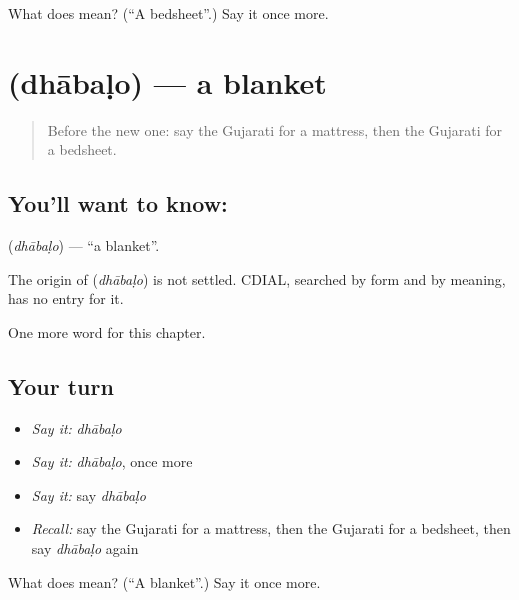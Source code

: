 \begin{tcolorbox}[breakable,colback=teal!4,colframe=teal!35!black,title={Before you move on}]
What does  mean? (\textquotedblleft{}A bedsheet\textquotedblright{}.) Say it once more.
\end{tcolorbox}
\section[\texorpdfstring{\gu{ધાબળો} (dhābaḷo)}{ધાબળો (dhābaḷo)}]{ (dhābaḷo) — a blanket}

\label{lesson:GU-C107-dhabalo}



\begin{quote}
Before the new one: say the Gujarati for a mattress, then the Gujarati for a bedsheet.
\end{quote}

\subsection*{You'll want to know: }
\textbf{} (\emph{dhābaḷo}) — \textquotedblleft{}a blanket\textquotedblright{}.

\begin{cousinweb}
The origin of \textbf{} (\emph{dhābaḷo}) is not settled. CDIAL, searched by form and by meaning, has no entry for it.
\end{cousinweb}

\begin{grammarlens}[title={What you've built}]
One more word for this chapter.
\end{grammarlens}

\subsection*{Your turn}
\begin{itemize}
\raggedright
  \item \emph{Say it:} \emph{dhābaḷo}
  \item \emph{Say it:} \emph{dhābaḷo}, once more
  \item \emph{Say it:} say \emph{dhābaḷo}
  \item \emph{Recall:} say the Gujarati for a mattress, then the Gujarati for a bedsheet, then say \emph{dhābaḷo} again
\end{itemize}

\begin{tcolorbox}[breakable,colback=teal!4,colframe=teal!35!black,title={Before you move on}]
What does  mean? (\textquotedblleft{}A blanket\textquotedblright{}.) Say it once more.
\end{tcolorbox}
